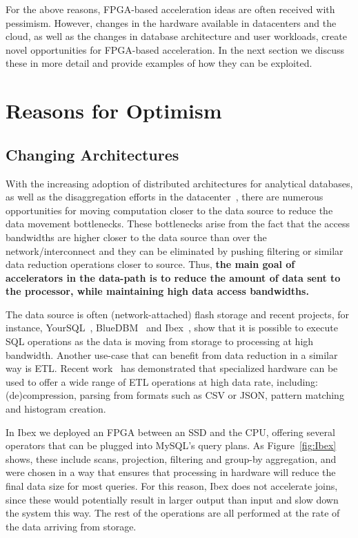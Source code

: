 \documentclass[11pt]{article}
\begin{document}
For the above reasons, FPGA-based acceleration ideas are often received with pessimism. However, changes in the hardware available in datacenters and the cloud, as well as the changes in database architecture and user workloads, create novel opportunities for FPGA-based acceleration. In the next section we discuss these in more detail and provide examples of how they can be exploited.







\section{Reasons for Optimism}



\subsection{Changing Architectures}

With the increasing adoption of distributed architectures for analytical databases, as well as the disaggregation efforts in the datacenter~\cite{klimovic-flash-eurosys16}, there are numerous opportunities for moving computation closer to the data source to reduce the data movement bottlenecks. These bottlenecks arise from the fact that the access bandwidths are higher closer to the data source than over the network/interconnect and they can be eliminated by pushing filtering or similar data reduction operations closer to source. Thus, \textbf{the main goal of accelerators in the data-path is to reduce the amount of data sent to the processor, while maintaining high data access bandwidths.} 


The data source is often (network-attached) flash storage and recent projects, for instance, YourSQL~\cite{jo-yoursql-vldb16}, BlueDBM~\cite{jun-bluedbm-tocs16} and Ibex~\cite{woods-Ibex-vldb14}, show that it is possible to execute SQL operations as the data is moving from storage to processing at high bandwidth. Another use-case that can benefit from data reduction in a similar way is ETL. Recent work~\cite{fang-udp-micro17} has demonstrated that specialized hardware can be used to offer a wide range of ETL operations at high data rate, including: (de)compression, parsing from formats such as CSV or JSON, pattern matching and histogram creation.

In Ibex we deployed an FPGA between an SSD and the CPU, offering several operators that can be plugged into MySQL's query plans. As Figure~\ref{fig:Ibex} shows, these include scans, projection, filtering and group-by aggregation, and were chosen in a way that ensures that processing in hardware will reduce the final data size for most queries. For this reason, Ibex does not accelerate joins, since these would potentially result in larger output than input and slow down the system this way. The rest of the operations are all performed at the rate of the data arriving from storage.
\end{document}
